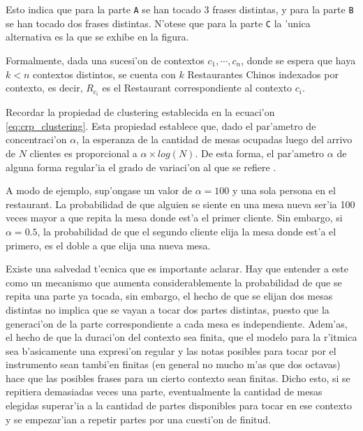 \begin{imagen}
    \width{10cm}
\end{imagen}


Esto indica que para la parte \texttt{A} se han tocado 3 frases distintas, y para la parte \texttt{B} se han tocado dos frases distintas. 
N'otese que para la parte \texttt{C} la 'unica alternativa es la que se exhibe en la figura.

Formalmente, dada una sucesi'on de contextos $c_1, \cdots, c_n$, donde se espera que haya $k<n$ contextos distintos, se cuenta con $k$ Restaurantes Chinos indexados por contexto,
es decir, $R_{c_i}$ es el Restaurant correspondiente al contexto $c_i$. 

Recordar la propiedad de clustering establecida en la ecuaci'on \ref{eq:crp_clustering}. Esta propiedad 
establece que, dado el par'ametro de concentraci'on $\alpha$, la esperanza de la cantidad de mesas ocupadas luego del arrivo de $N$ clientes es proporcional a $\alpha\times log(N)$.
De esta forma, el par'ametro $\alpha$ de alguna forma regular'ia el grado de variaci'on al que se refiere \cite{Deliege90}. 

A modo de ejemplo, sup'ongase un valor de $\alpha=100$ y una sola persona
en el restaurant. La probabilidad de que alguien se siente en una mesa nueva ser'ia 100 veces mayor a que repita la mesa donde est'a el primer cliente. Sin embargo, si $\alpha=0.5$, 
la probabilidad de que el segundo cliente elija la mesa donde est'a el primero, es el doble a que elija una nueva mesa.

Existe una salvedad t'ecnica que es importante aclarar. Hay que entender a este como un mecanismo que aumenta considerablemente la probabilidad de que se repita una parte ya tocada,
sin embargo, el hecho de que se elijan dos mesas distintas no implica que se vayan a tocar dos partes distintas, puesto que la generaci'on de la parte correspondiente
a cada mesa es independiente. Adem'as, el hecho de que la duraci'on del contexto sea finita, que el modelo para la r'itmica sea b'asicamente una expresi'on regular y 
las notas posibles para tocar por el instrumento sean tambi'en finitas (en general no mucho m'as que dos octavas) hace que las posibles frases para un cierto contexto
sean finitas. Dicho esto, si se repitiera demasiadas veces una parte, eventualmente la cantidad de mesas elegidas superar'ia a la cantidad de partes disponibles
para tocar en ese contexto y se empezar'ian a repetir partes por una cuesti'on de finitud. 

